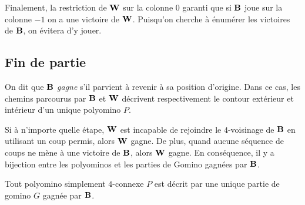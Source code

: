 Finalement, la restriction de $\mathbf{W}$ sur la colonne $0$ garanti que si $\mathbf{B}$ joue sur la colonne $-1$ on a une victoire de $\mathbf{W}$. Puisqu'on cherche à énumérer les victoires de $\mathbf{B}$, on évitera d'y jouer.

\vspace{-0.5em}
\subsection{Fin de partie}

\vspace{-0.5em}
On dit que \emph{$\mathbf{B}$ gagne} s'il parvient à revenir à sa position d'origine. Dans ce cas, les chemins parcourus par $\mathbf{B}$ et $\mathbf{W}$ décrivent respectivement le contour extérieur et intérieur d'un unique polyomino $P$.

Si à n'importe quelle étape, $\mathbf{W}$ est incapable de rejoindre le $4$-voisinage de $\mathbf{B}$ en utilisant un coup permis, alors $\mathbf{W}$ gagne. De plus, quand aucune séquence de coups ne mène à une victoire de $\mathbf{B}$, alors $\mathbf{W}$ gagne. En conséquence, il y a bijection entre les polyominos et les parties de Gomino gagnées par $\mathbf{B}$.

\begin{theorem}\label{thm:G=P}
Tout polyomino simplement $4$-connexe $P$ est décrit par une unique partie de gomino $G$ gagnée par $\mathbf{B}$.
\end{theorem}

